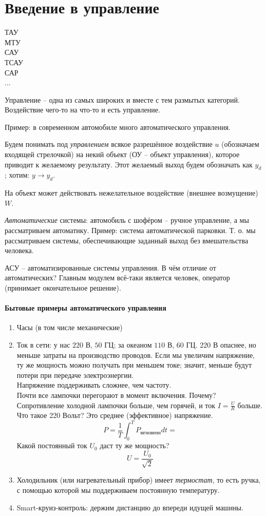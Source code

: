 \documentclass[main.tex]{subfiles}
\begin{document}
\chapter{Введение в управление}

ТАУ \\
МТУ \\
САУ \\
ТСАУ \\
САР \\
...

Управление -- одна из самых широких и вместе с тем размытых категорий. Воздействие чего-то на что-то и есть управление.

Пример: в современном автомобиле много автоматического управления.

Будем понимать под \emph{управлением} всякое разрешённое воздействие $ u $ (обозначаем входящей стрелочкой) на некий объект (ОУ -- объект управления), которое приводит к желаемому результату.
Этот желаемый выход будем обозначать как $ y_d $; хотим: $ y \to y_d $.

На объект может действовать нежелательное воздействие (внешнее возмущение) $ W $.

\emph{Автоматические} системы: автомобиль с шофёром -- ручное управление, а мы рассматриваем автоматику.
Пример: система автоматической парковки. Т. о. мы рассматриваем системы, обеспечивающие заданный выход без вмешательства человека.

АСУ -- автоматизированные системы управления.
В чём отличие от автоматических?
Главным модулем всё-таки является человек, оператор (принимает окончательное решение).

\subsubsection{Бытовые примеры автоматического управления}

\begin{enumerate}[noitemsep]
    \item Часы (в том числе механические)
    \item Ток в сети: у нас $220$ В, $50$ ГЦ; за океаном $110$ В, $60$ ГЦ. 220 В опаснее, но меньше затраты на производство проводов. Если мы увеличим напряжение, ту же мощность можно получать при меньшем токе; значит, меньше будут потери при передаче электроэнергии. \\
    Напряжение поддерживать сложнее, чем частоту. \\
    Почти все лампочки перегорают в момент включения. Почему? Сопротивление холодной лампочки больше, чем горячей, и ток  $ I = \frac{U}{R} $ больше. \\
    Что такое 220 Вольт? Это среднее (эффективное) напряжение.
    $$ P = \frac{1}{T} \int_0^T P_{\text{мгновенн}} dt =  $$ %
    Какой постоянный ток $ U_0 $ даст ту же мощность?
    $$ U = \frac{U_0}{\sqrt 2} $$
    \item Холодильник (или нагревательный прибор) имеет \emph{термостат}, то есть ручка, с помощью которой мы поддерживаем постоянную температуру.
    \item Smart-круиз-контроль: держим дистанцию до впереди идущей машины.
\end{enumerate}
\end{document}
